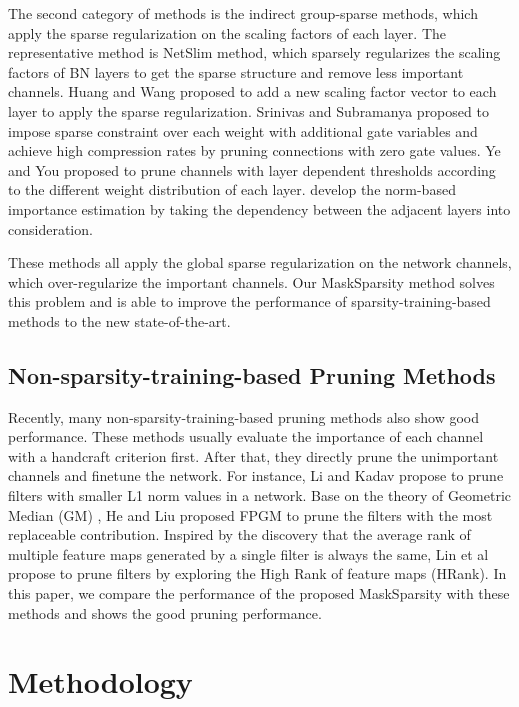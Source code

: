 \documentclass[review]{cvpr}
\begin{document}
 
The second category of methods is the indirect group-sparse methods, which apply the sparse regularization on the scaling factors of each layer. The representative method is NetSlim \cite{liu2017learning} method, which sparsely regularizes the scaling factors of BN layers to get the sparse structure and remove less important channels. Huang and Wang \cite{huang2018data} proposed to add a new scaling factor vector to each layer to apply the sparse regularization. Srinivas and Subramanya \cite{Srinivas2017TrainingSN} proposed to impose sparse constraint over each weight with additional gate variables and achieve high compression rates by pruning connections with zero gate values. Ye and You \cite{OT} proposed to prune channels with layer dependent thresholds according to the different weight distribution of each layer. \cite{Dependency} develop the norm-based importance estimation by taking the dependency between the adjacent layers into consideration.
 

These methods all apply the global sparse regularization on the network channels, which over-regularize the important channels. Our MaskSparsity method solves this problem and is able to improve the performance of sparsity-training-based methods to the new state-of-the-art.

\subsection{Non-sparsity-training-based Pruning Methods}
Recently, many non-sparsity-training-based pruning methods also show good performance. These methods usually evaluate the importance of each channel with a handcraft criterion first. After that, they directly prune the unimportant channels and finetune the network.
For instance, Li and Kadav \cite{L1} propose to prune filters with smaller L1 norm values in a network. Base on the theory of Geometric Median (GM) \cite{GM}, He and Liu proposed FPGM\cite{FPGM} to prune the filters with the most replaceable contribution. Inspired by the discovery that the average rank of multiple feature maps generated by a single filter is always the same, Lin et al \cite{lin2020hrank} propose to prune filters by exploring the High Rank of feature maps (HRank).  
In this paper, we compare the performance of the proposed MaskSparsity with these methods and shows the good pruning performance.

 


\section{Methodology}
\end{document}
